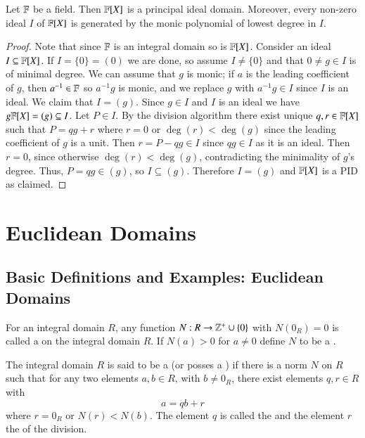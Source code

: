 \documentclass[12pt, a4paper, oneside, openright, titlepage]{book}
\begin{document}
\begin{thm}
    Let $\mathbb F$ be a field. Then $\mathbb F[X]$ is a principal ideal domain. Moreover, every non-zero ideal $I$ of $\mathbb F[X]$ is generated by the monic polynomial of lowest degree in $I$.
\end{thm}
\begin{proof}
    Note that since $\mathbb F$ is an integral domain so is $\mathbb F[X]$. Consider an ideal $I \subseteq \mathbb F[X]$. If $I = \{0\} = (0)$ we are done, so assume $I \neq \{0\}$ and that $0 \neq g \in I$ is of minimal degree. We can assume that $g$ is monic; if $a$ is the leading coefficient of $g$, then $a^{-1} \in \mathbb F$ so $a^{-1}g$ is monic, and we replace $g$ with $a^{-1}g \in I$ since $I$ is an ideal. We claim that $I = (g)$. Since $g \in I$ and $I$ is an ideal we have $g\mathbb F[X] = (g) \subseteq I$. Let $P \in I$. By the division algorithm there exist unique $q,r \in \mathbb F[X]$ such that $P = qg + r$ where $r = 0$ or $\deg(r) < \deg(g)$ since the leading coefficient of $g$ is a unit. Then $r = P - qg \in I$ since $qg \in I$ as it is an ideal. Then $r = 0$, since otherwise $\deg(r) < \deg(g)$, contradicting the minimality of $g$'s degree. Thus, $P = qg \in (g)$, so $I \subseteq (g)$. Therefore $I = (g)$ and $\mathbb F[X]$ is a PID as claimed.
\end{proof}



\chapter{\textsection\textsection Euclidean Domains}

\section{\textsection Basic Definitions and Examples: Euclidean Domains}

\begin{defn}[Norm]
    For an integral domain $R$, any function $N:R\rightarrow \mathbb Z^+\cup\{0\}$ with $N(0_R) = 0$ is called a  on the integral domain $R$. If $N(a) > 0$ for $a \neq 0$ define $N$ to be a .
\end{defn}

\begin{defn}
    The integral domain $R$ is said to be a  (or posses a ) if there is a norm $N$ on $R$ such that for any two elements $a,b \in R$, with $b \neq 0_R$, there exist elements $q,r \in R$ with $$a= qb+r$$ where $r = 0_R$ or $N(r) < N(b)$. The element $q$ is called the  and the element $r$ the  of the division.
\end{defn}
\end{document}
